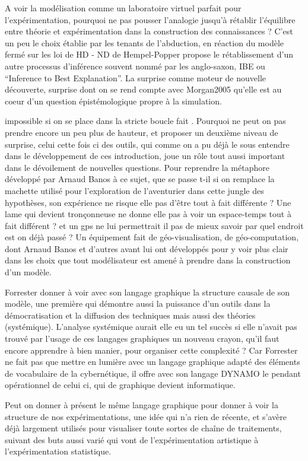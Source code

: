 A voir la modélisation comme un laboratoire virtuel parfait pour l'expérimentation, pourquoi ne pas pousser l'analogie jusqu'à rétablir l'équilibre entre théorie et expérimentation dans la construction des connaissances ? C'est un peu le choix établie par les tenants de l'abduction,  en réaction du modèle fermé sur les loi de HD - ND de Hempel-Popper propose le rétablissement d'un autre processus d'inférence souvent nommé par les anglo-saxon, IBE ou \foreignquote{english}{Inference to Best Explanation}. La surprise comme moteur de nouvelle découverte, surprise dont on se rend compte avec Morgan2005 qu'elle est au coeur d'un question épistémologique propre à la simulation.

impossible si on se place dans la stricte boucle fait . Pourquoi ne peut on pas prendre encore un peu plus de hauteur, et proposer un deuxième niveau de surprise, celui cette fois ci des outils, qui comme on a pu déjà le sous entendre dans le développement de ces introduction, joue un rôle tout aussi important dans le dévoilement de nouvelles questions. Pour reprendre la métaphore développé par Arnaud Banos \autocite[22]{Banos2013} à ce sujet, que se passe t-il si on remplace la machette utilisé pour l'exploration de l'aventurier dans cette jungle des hypothèses, son expérience ne risque elle pas d'être tout à fait différente ? Une lame qui devient tronçonneuse ne donne elle pas à voir un espace-temps tout à fait différent ? et un gps ne lui permettrait il pas de mieux savoir par quel endroit est on déjà passé ? Un équipement fait de géo-visualisation, de géo-computation, dont Arnaud Banos et d'autres avant lui ont développés pour y voir plus clair dans les choix que tout modélisateur est amené à prendre dans la construction d'un modèle.

Forrester donner à voir avec son langage graphique la structure causale de son modèle, une première qui démontre aussi la puissance d'un outils dans la démocratisation et la diffusion des techniques mais aussi des théories (systémique). L'analyse systémique aurait elle eu un tel succès si elle n'avait pas trouvé par l'usage de ces langages graphiques un nouveau crayon, qu'il faut encore apprendre à bien manier, pour organiser cette complexité ? Car Forrester ne fait pas que mettre en lumière avec un langage graphique adapté des éléments de vocabulaire de la cybernétique, il offre avec son langage DYNAMO le pendant opérationnel de celui ci, qui de graphique devient informatique. 

Peut on donner à présent le même langage graphique pour donner à voir la structure de nos expérimentations, une idée qui n'a rien de récente, et s'avère déjà largement utilisés pour visualiser toute sortes de chaîne de traitements, suivant des buts aussi varié qui vont de l'expérimentation artistique à l'expérimentation statistique.

